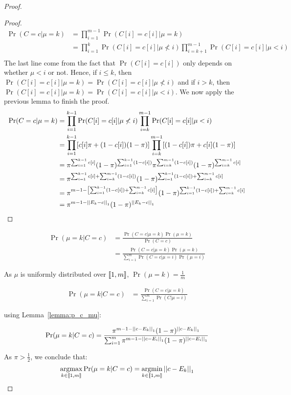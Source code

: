 \begin{proof}
\begin{proof}
    \begin{align}
        \Pr(C = c| \mu = k)
        &= \prod_{i = 1}^{m -1} \Pr(C[i] = c[i] | \mu = k)\\
        &= \prod_{i = 1}^{k} \Pr(C[i] = c[i] | \mu \not< i ) \prod_{i = k+1}^{m-1} \Pr(C[i] = c[i] | \mu < i)\\
    \end{align}
    The last line come from the fact that $\Pr(C[i] = c[i])$ only depends on whether $\mu < i$ or not. Hence, if $i \leq k$, then $\Pr(C[i] = c[i] | \mu = k) = \Pr(C[i] = c[i] | \mu \not< i)$ and if $i > k$, then $\Pr(C[i] = c[i] | \mu = k) = \Pr(C[i] = c[i] | \mu<i)$. We now apply the previous lemma to finish the proof.
    \begin{align}
        \Pr(C = c| \mu = k)
        &= \prod_{i = 1}^{k-1} \Pr(C[i] = c[i] | \mu \not< i) \prod_{i = k}^{m-1} \Pr(C[i] = c[i] | \mu < i)\\
        &= \prod_{i = 1}^{k-1} [c[i] \pi + (1 - c[i]) (1 - \pi)] \prod_{i = k}^{m-1} [(1 - c[i]) \pi + c[i] (1 - \pi)]\\
        &= \pi^{\sum_{i = 1}^{k-1} c[i]} (1 - \pi)^{\sum_{i = 1}^{k-1} (1 - c[i])} \pi^{\sum_{i = k}^{m-1} (1 - c[i])} (1 - \pi)^{\sum_{i = k}^{m-1} c[i]}\\
        &= \pi^{\sum_{i = 1}^{k-1} c[i] + \sum_{i = k}^{m-1} (1 - c[i])} (1 - \pi)^{\sum_{i = 1}^{k-1} (1 - c[i]) + \sum_{i = k}^{m-1} c[i]} \\
        &= \pi^{m - 1 - \left[\sum_{i = 1}^{k-1} (1 - c[i]) + \sum_{i = k}^{m -1} c[i] \right]} (1 - \pi)^{\sum_{i = 1}^{k-1} (1 - c[i]) + \sum_{i = k}^{m-1} c[i]}\\
        &= \pi^{m - 1 - \left|\left|E_k - c\right|\right|_1} (1 - \pi)^{\left|\left|E_k - c\right|\right|_1}
    \end{align}
\end{proof}


\begin{align}
    \Pr(\mu = k | C = c) 
    &= \frac{\Pr(C = c | \mu = k) \Pr(\mu = k)}{\Pr(C=c)}\\
    &= \frac{\Pr(C = c | \mu = k) \Pr(\mu = k)}{\sum_{i = 1}^m \Pr(C = c | \mu = i) \Pr(\mu = i)}
\end{align}

As $\mu$ is uniformly distributed over $\left\llbracket1, m\right\rrbracket$, $\Pr(\mu = k) = \frac{1}{m}$

\begin{align}
    \Pr(\mu = k | C = c) 
    &= \frac{\Pr(C = c| \mu = k)}{\sum_{i = 1}^m \Pr(C | \mu = i)}
\end{align}

using Lemma~\ref{lemma:p_c_mu}:

\begin{align}
    \Pr(\mu = k | C = c)
    &= \frac{\pi^{m - 1 - \left|\left|c - E_k\right|\right|_1} (1 - \pi)^{\left|\left|c - E_k\right|\right|_1}}{\sum_{i = 1}^m \pi^{m - 1 - \left|\left|c - E_i\right|\right|_1} (1 - \pi)^{\left|\left|c - E_i\right|\right|_1}}\\
\end{align}

As $\pi > \frac{1}{2}$, we conclude that:
\[\operatorname*{argmax}_{k \in \left\llbracket1, m\right\rrbracket} \Pr(\mu = k | C = c) = \operatorname*{argmin}_{k \in \left\llbracket1, m\right\rrbracket} \left|\left|c - E_k\right|\right|_1\]
\end{proof}


